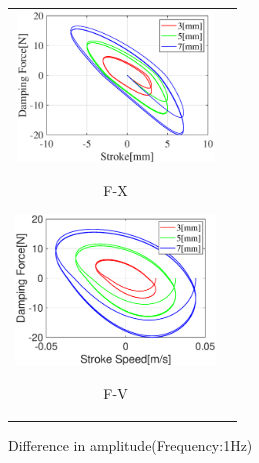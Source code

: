 \documentclass[a4paper,12pt]{article_vdlab_sotsuron}
\begin{document}
\vspace*{5mm}
\begin{figure}[h]
  \begin{tabular}{cc}
  \begin{minipage}{0.5\hsize}
  \begin{center}
    \includegraphics[height=40mm]{figure/damper_x_1_Fx.eps}
    \end{center}
    \begin{center}
    \ F-X\
    \end{center}
  \end{minipage}
  \begin{minipage}{0.5\hsize}
     \begin{center}
      \includegraphics[height=40mm]{figure/damper_x_1_Fv.eps}
      \end{center}
      \begin{center}
      \ F-V\
    \end{center}
  \end{minipage}
  \end{tabular}
  \vspace*{3mm}
  \caption{Difference in amplitude(Frequency:1Hz)}
    \label{fig:damper_x_3}
\end{figure}
\end{document}
